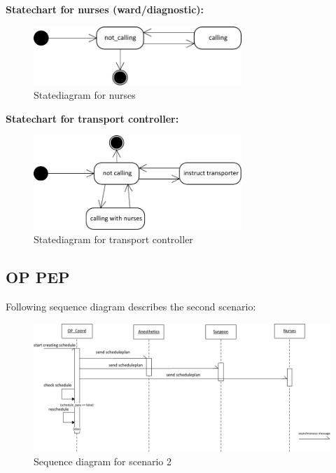 \textbf{Statechart for nurses (ward/diagnostic):}
\begin{figure}[!htb]
  \centering  
  \includegraphics[width=0.7\textwidth]{pics/ub3/a/1a_nurse} 
  \caption{Statediagram for nurses}
  \label{fig:1a_nurse_dia} 
 \end{figure}
 
 \textbf{Statechart for transport controller:}
\begin{figure}[!htb]
  \centering  
  \includegraphics[width=0.7\textwidth]{pics/ub3/a/1a_contr} 
  \caption{Statediagram for transport controller}
  \label{fig:1a_contr_dia} 
 \end{figure}
 
 
 \newpage
\subsection{OP PEP}
Following sequence diagram describes the second scenario:
\begin{figure}[!htb]
  \centering  
  \includegraphics[width=1.1\textwidth]{pics/ub3/b/1b_seq} 
  \caption{Sequence diagram for scenario 2}
  \label{fig:1b_seq} 
 \end{figure}
 
